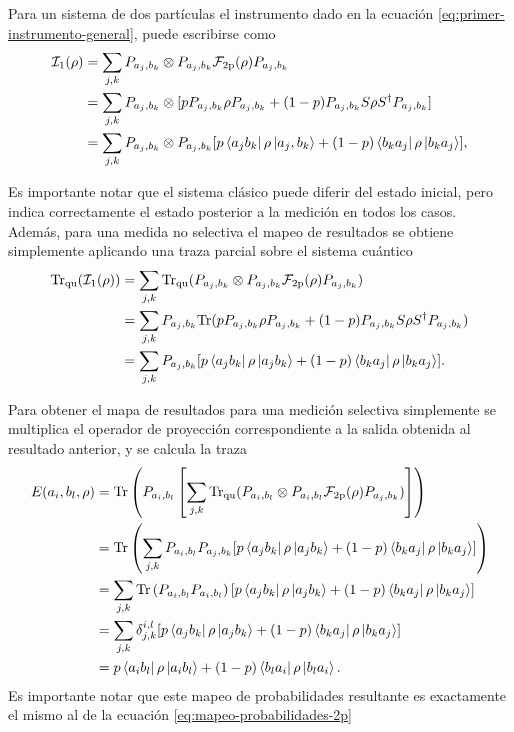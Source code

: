 Para un sistema de dos partículas el instrumento dado en la ecuación {\eqref{eq:primer-instrumento-general}}, puede escribirse como\begin{equation}\label{eq:fisrtinstrument2p}
    \begin{split}
        \mathcal{I}_1{(\rho)}&=\sum_{j,k}P_{a_j,b_k}\otimes P_{a_j,b_k} \mathcal{F}_{2\text{p}}(\rho) P_{a_j,b_k}\\
        &=\sum_{j,k}P_{a_j,b_k}\otimes[p P_{a_j,b_k}\rho P_{a_j,b_k}+(1-p)P_{a_j,b_k}S\rho S^\dagger P_{a_j,b_k}]\\
        &=\sum_{j,k}P_{a_j,b_k}\otimes P_{a_j,b_k} [p \bra{a_j b_k}\rho \ket{a_j,b_k}+(1-p)\bra{b_k a_j }\rho \ket {b_k a_j}],
\end{split}
\end{equation}

Es importante notar que el sistema clásico  puede diferir del estado inicial,
pero  indica correctamente el estado posterior a la medición en todos los
casos. Además, para una medida no selectiva el mapeo de resultados se obtiene
simplemente aplicando una traza parcial sobre el sistema cuántico 
\begin{equation}\label{eq:traza_q_1instrument2p}
    \begin{split}
        {\rm Tr}_{\text{qu}}(\mathcal{I}_1{(\rho)})&=\sum_{j,k}{\rm Tr}_{\text{qu}}(P_{a_j,b_k}\otimes P_{a_j,b_k} \mathcal{F}_{2\text{p}}(\rho) P_{a_j,b_k})\\
        &=\sum_{j,k}P_{a_j,b_k}{\rm Tr}(p P_{a_j,b_k}\rho P_{a_j,b_k}+(1-p)P_{a_j,b_k}S\rho S^\dagger P_{a_j,b_k})\\
        &=\sum_{j,k}P_{a_j,b_k}[p \bra{a_j b_k}\rho\ket{a_j b_k} +(1-p)\bra{b_k a_j}\rho \ket{b_k a_j}].
\end{split}
\end{equation} 


Para obtener el mapa de resultados para una medición selectiva simplemente se
multiplica el operador de proyección correspondiente a la salida obtenida al
resultado anterior, y se calcula la traza\[\begin{split}
    E(a_i,b_l,\rho)&={\rm Tr}\left(P_{a_i, b_l}\left[\sum_{j,k}{\rm Tr}_{\text{qu}}(P_{a_i,b_l}\otimes P_{a_i,b_l} \mathcal{F}_{2\text{p}}(\rho) P_{a_j,b_k})\right]\right)\\
    &={\rm Tr}\left(\sum_{j,k} P_{a_i,b_l}P_{a_j,b_k}[p \bra{a_j b_k}\rho\ket{a_j b_k} +(1-p)\bra{b_k a_j}\rho \ket{b_k a_j}]\right)\\
    &=\sum_{j,k}{\rm Tr}\left( P_{a_i,b_l}P_{a_i,b_l}\right)[p \bra{a_j b_k}\rho\ket{a_j b_k} +(1-p)\bra{b_k a_j}\rho \ket{b_k a_j}]\\
    &=\sum_{j,k}\delta^{i,l}_{j,k}[p \bra{a_j b_k}\rho\ket{a_j b_k} +(1-p)\bra{b_k a_j}\rho \ket{b_k a_j}]\\
    &=p \bra{a_i b_l}\rho\ket{a_i b_l} +(1-p)\bra{b_l a_i}\rho \ket{b_l a_i}.
\end{split}\]Es importante notar que este mapeo de probabilidades resultante es exactamente el mismo al de la ecuación {\eqref{eq:mapeo-probabilidades-2p}}

